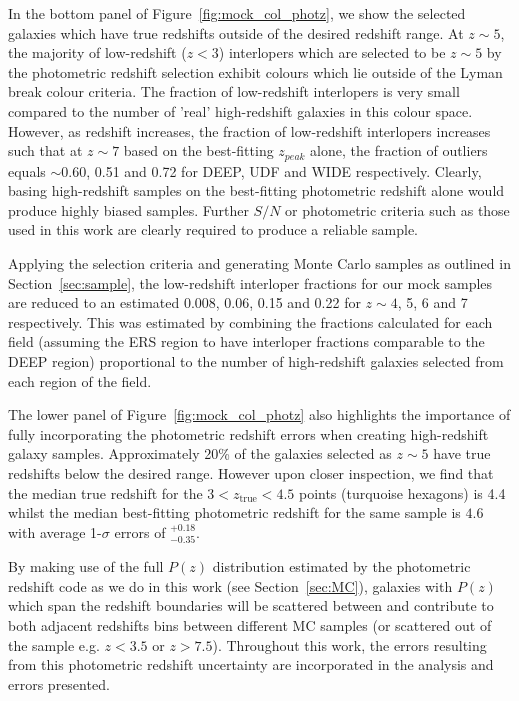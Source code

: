 In the bottom panel of Figure~\ref{fig:mock_col_photz}, we show the selected galaxies which have true redshifts outside of the desired redshift range. At $z\sim 5$, the majority of low-redshift ($z < 3$) interlopers which are selected to be $z\sim5$ by the photometric redshift selection exhibit colours which lie outside of the Lyman break colour criteria. The fraction of low-redshift interlopers is very small compared to the number of 'real' high-redshift galaxies in this colour space. However, as redshift increases, the fraction of low-redshift interlopers increases such that at $z \sim 7$ based on the best-fitting $z_{peak}$ alone, the fraction of outliers equals $\sim 0.60$, 0.51 and 0.72 for DEEP, UDF and WIDE respectively. Clearly, basing high-redshift samples on the best-fitting photometric redshift alone would produce highly biased samples. Further $S/N$ or photometric criteria such as those used in this work are clearly required to produce a reliable sample.

Applying the selection criteria and generating Monte Carlo samples as outlined in Section~\ref{sec:sample}, the low-redshift interloper fractions for our mock samples are reduced to an estimated 0.008, 0.06, 0.15 and 0.22 for $z \sim 4$, 5, 6 and 7 respectively. This was estimated by combining the fractions calculated for each field (assuming the ERS region to have interloper fractions comparable to the DEEP region) proportional to the number of high-redshift galaxies selected from each region of the field. 

The lower panel of Figure~\ref{fig:mock_col_photz} also highlights the importance of fully incorporating the photometric redshift errors when creating high-redshift galaxy samples. Approximately 20\% of the galaxies selected as $z\sim5$ have true redshifts below the desired range. However upon closer inspection, we find that the median true redshift for the $3 < z_{\text{true}} < 4.5$ points (turquoise hexagons) is 4.4 whilst the median best-fitting photometric redshift for the same sample is $4.6$ with average 1-$\sigma$ errors of $^{+0.18}_{-0.35}$.

By making use of the full $P(z)$ distribution estimated by the photometric redshift code as we do in this work (see Section~\ref{sec:MC}), galaxies with $P(z)$ which span the redshift boundaries will be scattered between and contribute to both adjacent redshifts bins between different MC samples (or scattered out of the sample e.g. $z < 3.5$ or $z > 7.5$). Throughout this work, the errors resulting from this photometric redshift uncertainty are incorporated in the analysis and errors presented.

